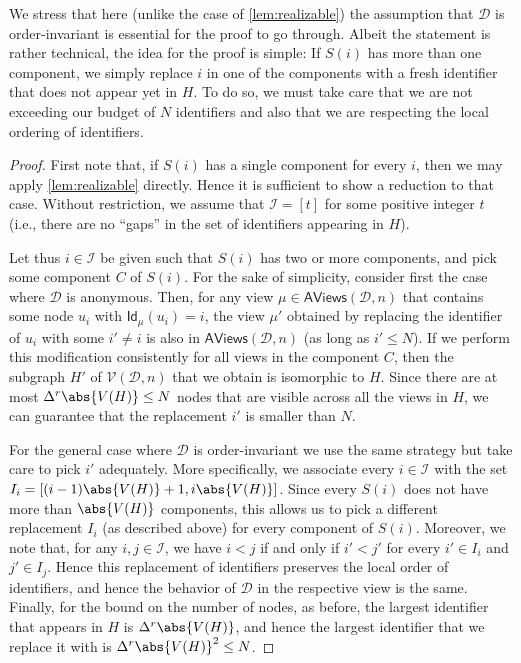 \documentclass[11pt]{article}
\newcommand*{\alvgd}{\mathcal{V}(\mathcal{D},n)}
\newcommand*{\aviewsd}{\mathsf{AViews}(\mathcal{D},n)}
\newcommand*{\ids}{\mathsf{Id}}
\begin{document}
We stress that here (unlike the case of \cref{lem:realizable}) the assumption
that $\mathcal{D}$ is order-invariant is essential for the proof to go through.
Albeit the statement is rather technical, the idea for the proof is simple:
If $S(i)$ has more than one component, we simply replace $i$ in one of the
components with a fresh identifier that does not appear yet in $H$.
To do so, we must take care that we are not exceeding our budget of $N$
identifiers and also that we are respecting the local ordering of identifiers.

\begin{proof}
  First note that, if $S(i)$ has a single component for every $i$, then we may
  apply \cref{lem:realizable} directly.
  Hence it is sufficient to show a reduction to that case.
  Without restriction, we assume that $\mathcal{I} = [t]$ for some positive
  integer $t$ (i.e., there are no \enquote{gaps} in the set of identifiers
  appearing in $H$).

  Let thus $i \in \mathcal{I}$ be given such that $S(i)$ has two or more
  components, and pick some component $C$ of $S(i)$.
  For the sake of simplicity, consider first the case where $\mathcal{D}$ is
  anonymous.
  Then, for any view $\mu \in \aviewsd$ that contains some node $u_i$ with
  $\ids_\mu(u_i) = i$, the view $\mu'$ obtained by replacing the identifier of
  $u_i$ with some $i' \neq i$ is also in $\aviewsd$ (as long as $i' \le N$).
  If we perform this modification consistently for all views in the component
  $C$, then the subgraph $H'$ of $\alvgd$ that we obtain is isomorphic to $H$.
  Since there are at most $\Delta^r \abs{V(H)} \le N$ nodes that are visible
  across all the views in $H$, we can guarantee that the replacement $i'$ is
  smaller than $N$.

  For the general case where $\mathcal{D}$ is order-invariant we use the same
  strategy but take care to pick $i'$ adequately.
  More specifically, we associate every $i \in \mathcal{I}$ with the set $I_i =
  [(i-1) \abs{V(H)} + 1, i \abs{V(H)}]$.
  Since every $S(i)$ does not have more than $\abs{V(H)}$ components, this
  allows us to pick a different replacement $I_i$ (as described above) for every
  component of $S(i)$.
  Moreover, we note that, for any $i,j \in \mathcal{I}$, we have $i < j$ if and
  only if $i' < j'$ for every $i' \in I_i$ and $j' \in I_j$.
  Hence this replacement of identifiers preserves the local order of
  identifiers, and hence the behavior of $\mathcal{D}$ in the respective view is
  the same.
  Finally, for the bound on the number of nodes, as before, the largest
  identifier that appears in $H$ is $\Delta^r \abs{V(H)}$, and hence the largest
  identifier that we replace it with is $\Delta^r \abs{V(H)}^2 \le N$.
\end{proof}
\end{document}
